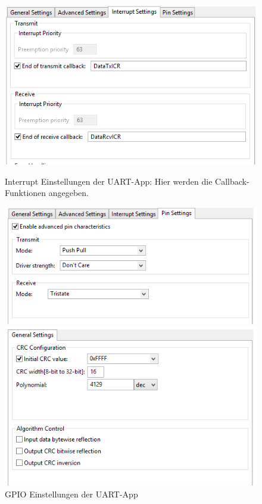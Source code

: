 \begin{figure}[!h]
  \begin{minipage}{0.45\textwidth}
    \centering
    \includegraphics[width=\textwidth]{UARTinterSet}
    \caption{Interrupt Einstellungen der UART-App: Hier werden die Callback-Funktionen angegeben.}
  \end{minipage}
  \begin{minipage}{0.45\textwidth}
    \centering
    \includegraphics[width=\textwidth]{UARTpinSet}
    \caption{GPIO Einstellungen der UART-App}
  \end{minipage}
  \begin{minipage}{0.45\textwidth}
    \centering
    \includegraphics[width=\textwidth]{CRCgeneralSet}

\end{minipage}
\end{figure}
